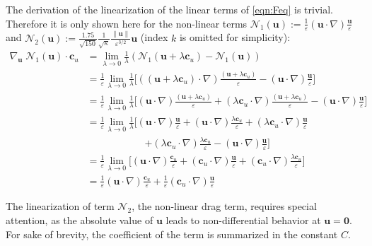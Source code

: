 \documentclass{article}
\newcommand{\norm}[1]{\lVert#1\rVert}
\newcommand{\vect}[1]{\mathbf{#1}}
\begin{document}
The derivation of the linearization of the linear terms of \eqref{eqn:Feq} is trivial. Therefore it is only shown here for the non-linear terms $\mathcal{N}_1(\vect u):=\frac{1}{\varepsilon} \left(\vect u \cdot \nabla \right) \frac{\vect u}{\varepsilon}$ and $\mathcal{N}_2(\vect u):= \frac{1.75}{\sqrt{150}} \frac{1}{\sqrt{\kappa}} \frac{\norm{\vect u}}{\varepsilon^{3/2}}\vect u$ (index $k$ is omitted for simplicity):
\begin{align*}
 \textstyle{ \nabla_{\vect u} \; \mathcal{N}_1({\vect u})\cdot \vect c_u  }& \textstyle{=\lim_{\lambda \to 0} \frac{1}{\lambda}\left(\mathcal{N}_1(\vect u+\lambda \vect c_u) - \mathcal{N}_1(\vect u)  \right)  }\\
 & \textstyle{= \frac{1}{\varepsilon} \lim_{\lambda \to 0} \frac{1}{\lambda}\big[         \left( (\vect u+\lambda \vect c_u) \cdot \nabla \right) \frac{ (\vect u + \lambda \vect c_u)}{\varepsilon} - \left( {\vect u} \cdot \nabla \right) \frac{{\vect u}}{\varepsilon}  \big] } \\
 & \textstyle{=\frac{1}{\varepsilon} \lim_{\lambda \to 0} \frac{1}{\lambda}\big[    (\vect u \cdot \nabla) \frac{ (\vect u + \lambda \vect c_u)}{\varepsilon} + (\lambda \vect c_u \cdot \nabla) \frac{ (\vect u + \lambda \vect c_u)}{\varepsilon} - \left( {\vect u} \cdot \nabla \right) \frac{{\vect u}}{\varepsilon}  \big] } \\
 & \textstyle{= \frac{1}{\varepsilon} \lim_{\lambda \to 0} \frac{1}{\lambda}\big[    (\vect u \cdot \nabla) \frac{ {\vect u}}{\varepsilon} + (\vect u \cdot \nabla) \frac{ \lambda \vect c_u}{\varepsilon} + (\lambda \vect c_u \cdot \nabla) \frac{{\vect u}}{\varepsilon} }\\
  &\;\;\;\;\;\;\;\;\;\;\;\;\;\;\;\;\;\;\;\;\;\textstyle{ +  (\lambda \vect c_u \cdot \nabla) \frac{ \lambda \vect c_u}{\varepsilon} - \left( {\vect u} \cdot \nabla \right) \frac{{\vect u}}{\varepsilon}  \big]} \\
 & \textstyle{= \frac{1}{\varepsilon} \lim_{\lambda \to 0} \big[  (\vect u \cdot \nabla) \frac{ \vect c_u}{\varepsilon} + ( \vect c_u \cdot \nabla) \frac{{\vect u}}{\varepsilon} + (\vect c_u \cdot \nabla) \frac{ \lambda \vect c_u}{\varepsilon}  \big]  }\\
 &\textstyle{= \frac{1}{\varepsilon}  (\vect u \cdot \nabla) \frac{ \vect c_u}{\varepsilon} + \frac{1}{\varepsilon} ( \vect c_u \cdot \nabla) \frac{{\vect u}}{\varepsilon}  }
\end{align*}

The linearization of term $\mathcal N_2$, the non-linear drag term, requires special attention, as the absolute value of $\vect {u}$ leads to non-differential behavior at $\vect u= \vect 0$. For sake of brevity, the coefficient of the term is summarized in the constant $C$.
\end{document}
